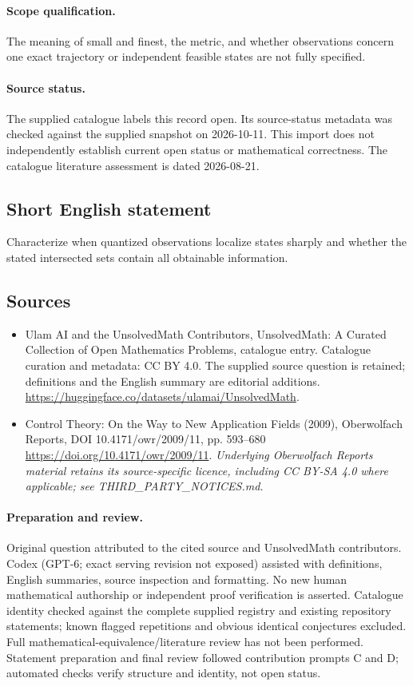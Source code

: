 \documentclass[11pt]{article}
\begin{document}
\paragraph{Scope qualification.}
The meaning of small and finest, the metric, and whether observations concern one exact trajectory or independent feasible states are not fully specified.
\paragraph{Source status.}
The supplied catalogue labels this record open. Its source-status metadata was checked against the supplied snapshot on 2026-10-11. This import does not independently establish current open status or mathematical correctness. The catalogue literature assessment is dated 2026-08-21.
\subsection{Short English statement}
Characterize when quantized observations localize states sharply and whether the stated intersected sets contain all obtainable information.
\subsection{Sources}
\begin{itemize}
\item[S1] Ulam AI and the UnsolvedMath Contributors, UnsolvedMath: A Curated Collection of Open Mathematics Problems, catalogue entry. Catalogue curation and metadata: CC BY 4.0. The supplied source question is retained; definitions and the English summary are editorial additions.
\url{https://huggingface.co/datasets/ulamai/UnsolvedMath}.
\item[S2] Control Theory: On the Way to New Application Fields (2009), Oberwolfach Reports, DOI 10.4171/owr/2009/11, pp. 593--680
\url{https://doi.org/10.4171/owr/2009/11}.
\textit{Underlying Oberwolfach Reports material retains its source-specific licence, including CC BY-SA 4.0 where applicable; see THIRD\_PARTY\_NOTICES.md.}
\end{itemize}
\paragraph{Preparation and review.}
Original question attributed to the cited source and UnsolvedMath contributors. Codex (GPT-6; exact serving revision not exposed) assisted with definitions, English summaries, source inspection and formatting. No new human mathematical authorship or independent proof verification is asserted. Catalogue identity checked against the complete supplied registry and existing repository statements; known flagged repetitions and obvious identical conjectures excluded. Full mathematical-equivalence/literature review has not been performed. Statement preparation and final review followed contribution prompts C and D; automated checks verify structure and identity, not open status.
\label{end:statement}
\end{document}
